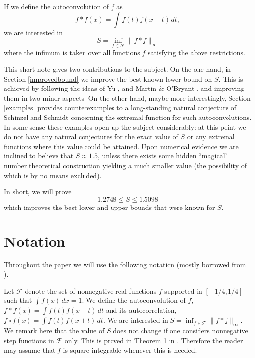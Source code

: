 \documentclass[12pt]{amsart}
\theoremstyle{definition}
\begin{document}
\medskip

If we define the autoconvolution of $f$ as
$$f\ast f(x) = \int f(t) f(x-t) \, dt,$$
we are interested in
$$S = \inf_{f\in \mathcal F} \|f\ast f\|_\infty$$
where the infimum is taken over all functions $f$ satisfying the above restrictions.

\medskip

This short note gives two contributions to the subject. On the one
hand, in Section \ref{improvedbound} we improve the best known
lower bound on $S$. This is achieved by following the ideas of Yu
\cite{yu}, and Martin \& O'Bryant \cite{martin}, and improving
them in two minor aspects. On the other hand, maybe more
interestingly, Section \ref{examples} provides counterexamples to
a long-standing natural conjecture of Schinzel and Schmidt
\cite{sch} concerning the extremal function for such
autoconvolutions. In some sense these examples open up the subject
considerably: at this point we do not have any natural conjectures
for the exact value of $S$ or any extremal functions where this
value could be attained. Upon numerical evidence we are inclined
to believe that $S\approx 1.5$, unless there exists some hidden
``magical'' number theoretical construction yielding a much smaller
value (the possibility of which is by no means excluded).

\medskip

In short, we will prove
$$1.2748 \le S \le 1.5098$$
which improves the best lower and upper bounds that were known for $S$.

\section{Notation}\label{notation}

Throughout the paper we will use the following notation (mostly
borrowed from \cite{martin}).

\medskip

Let $\mathcal F$ denote the set of nonnegative real functions $f$
supported in $[-1/4,1/4]$ such that $\int f(x) \, dx=1$. We define
the autoconvolution of $f$, $f\ast f(x) = \int f(t) f(x-t) \, dt$
and its autocorrelation, $f \circ f (x) = \int f(t) f(x+t) \, dt$.
We are interested in $S = \inf_{f\in \mathcal F} \|f\ast
f\|_\infty$. We remark here that the value of $S$ does not change
if one considers nonnegative step functions in $\mathcal F$ only.
This is proved in Theorem 1 in \cite{sch}. Therefore the reader
may assume that $f$ is square integrable whenever this is needed.
\end{document}
